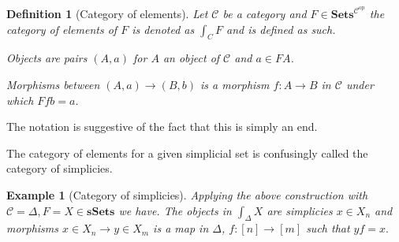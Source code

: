 \documentclass[12pt]{report}
\numberwithin{equation}{section}
\newtheorem{definition}[dummy]{Definition}
\newtheorem{example}[dummy]{Example}
\begin{document}
%				
%				
%			
%	
%		
%			
	
	\begin{definition}[Category of elements]
		Let $\mathcal{C}$ be a category and $F\in \mathbf{Sets}^{\mathcal{C}^{\mathrm{op}}}$ the category of elements of $F$ is denoted as $\int_{C} F $ and is defined as such.
		
		Objects are pairs $(A,a)$ for $A$ an object of $\mathcal{C}$ and $a \in FA$.
		
		Morphisms between $(A,a) \to (B,b)$ is a morphism $f:A\to B$ in $\mathcal{C}$ under which $Ffb=a$.
	\end{definition}
	The notation is suggestive of the fact that this is simply an end.
	
	The category of elements for a given simplicial set is confusingly called the category of simplicies.
	\begin{example}[Category of simplicies]
		Applying the above construction with $\mathcal{C}=\Delta, F=X \in \mathbf{sSets}$ we have. The objects in $\int_\Delta X$ are simplicies $x \in X_n$ and morphisms $x\in X_n \to y\in X_m$ is a map in $\Delta$, $f:[n]\to [m] $ such that $yf=x.$
	\end{example}
	
\end{document}
